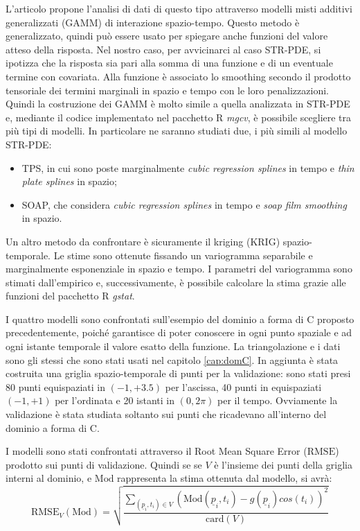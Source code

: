 \documentclass[a4paper,11pt,twoside,openright]{book}							%
\begin{document}
L'articolo \cite{art:augustin} propone l'analisi di dati di questo tipo attraverso modelli misti additivi generalizzati (GAMM) di interazione spazio-tempo. Questo metodo è generalizzato, quindi può essere usato per spiegare anche funzioni del valore atteso della risposta. Nel nostro caso, per avvicinarci al caso STR-PDE, si ipotizza che la risposta sia pari alla somma di una funzione e di un eventuale termine con covariata. Alla funzione è associato lo smoothing secondo il prodotto tensoriale dei termini marginali in spazio e tempo con le loro penalizzazioni. Quindi la costruzione dei GAMM è molto simile a quella analizzata in STR-PDE e, mediante il codice implementato nel pacchetto R \textit{mgcv}, è possibile scegliere tra più tipi di modelli. In particolare ne saranno studiati due, i più simili al modello STR-PDE:
\begin{itemize}
\item TPS, in cui sono poste marginalmente \textit{cubic regression splines} in tempo e \textit{thin plate splines} in spazio;
\item SOAP, che considera \textit{cubic regression splines} in tempo e \textit{soap film smoothing} in spazio.
\end{itemize}

Un altro metodo da confrontare è sicuramente il kriging (KRIG) spazio-temporale. Le stime sono ottenute fissando un variogramma separabile e marginalmente esponenziale in spazio e tempo. I parametri del variogramma sono stimati dall'empirico e, successivamente, è possibile calcolare la stima grazie alle funzioni del pacchetto R \textit{gstat}. 

I quattro modelli sono confrontati sull'esempio del dominio a forma di C proposto precedentemente, poiché garantisce di poter conoscere in ogni punto spaziale e ad ogni istante temporale il valore esatto della funzione. La triangolazione e i dati sono gli stessi che sono stati usati nel capitolo \ref{cap:domC}. In aggiunta è stata costruita una griglia spazio-temporale di punti per la validazione: sono stati presi 80 punti equispaziati in $(-1,+3.5)$ per l'ascissa, 40 punti in equispaziati $(-1,+1)$ per l'ordinata e 20 istanti in $(0,2\pi)$ per il tempo. Ovviamente la validazione è stata studiata soltanto sui punti che ricadevano all'interno del dominio a forma di C.

I modelli sono stati confrontati attraverso il Root Mean Square Error ($\mathrm{RMSE}$) prodotto sui punti di validazione. Quindi se se $V$ è l'insieme dei punti della griglia interni al dominio, e $\mathrm{Mod}$ rappresenta la stima ottenuta dal modello, si avrà:
$$
\mathrm{RMSE}_V(\mathrm{Mod})=\sqrt{\frac{\sum_{(\underline p_i,t_i)\in V} (\mathrm{Mod}(\underline p_i,t_i)-g(\underline p_i)cos(t_i))^2}{\mathrm{card}(V)}}
$$ 
\end{document}
